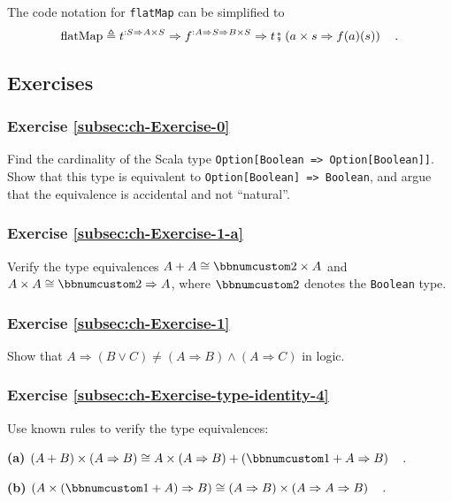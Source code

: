 The code notation for \lstinline!flatMap! can be simplified to
\[
\text{flatMap}\triangleq t^{:S\Rightarrow A\times S}\Rightarrow f^{:A\Rightarrow S\Rightarrow B\times S}\Rightarrow t\bef\left(a\times s\Rightarrow f(a)(s)\right)\quad.
\]


\subsection{Exercises}

\subsubsection{Exercise \label{subsec:ch-Exercise-0}\ref{subsec:ch-Exercise-0}}

Find the cardinality of the Scala type \lstinline!Option[Boolean => Option[Boolean]]!.
Show that this type is equivalent to \lstinline!Option[Boolean] => Boolean!,
and argue that the equivalence is accidental
and not ``natural''.

\subsubsection{Exercise \label{subsec:ch-Exercise-1-a}\ref{subsec:ch-Exercise-1-a}}

Verify the type equivalences $A+A\cong\bbnum 2\times A$ and $A\times A\cong\bbnum 2\Rightarrow A$,
where $\bbnum 2$ denotes the \lstinline!Boolean! type.

\subsubsection{Exercise \label{subsec:ch-Exercise-1}\ref{subsec:ch-Exercise-1}}

Show that $A\Rightarrow(B\vee C)\neq(A\Rightarrow B)\wedge(A\Rightarrow C)$
in logic.

\subsubsection{Exercise \label{subsec:ch-Exercise-type-identity-4}\ref{subsec:ch-Exercise-type-identity-4}}

Use known rules to verify the type equivalences:

\textbf{(a)} $\left(A+B\right)\times\left(A\Rightarrow B\right)\cong A\times\left(A\Rightarrow B\right)+\left(\bbnum 1+A\Rightarrow B\right)\quad.$

\textbf{(b)} $\left(A\times(\bbnum 1+A)\Rightarrow B\right)\cong\left(A\Rightarrow B\right)\times\left(A\Rightarrow A\Rightarrow B\right)\quad.$


